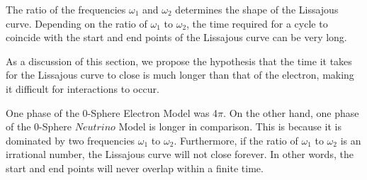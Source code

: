\documentclass[%
 reprint,
 amsmath,amssymb,
 aps,
]{revtex4-1}
\numberwithin{equation}{section}%
\begin{document}


The ratio of the frequencies $\omega_{\mathrm{1}}$ and $\omega_{\mathrm{2}}$ determines the shape of the Lissajous curve. Depending on the ratio of $\omega_{\mathrm{1}}$ to $\omega_{\mathrm{2}}$, the time required for a cycle to coincide with the start and end points of the Lissajous curve can be very long.

As a discussion of this section, we propose the hypothesis that the time it takes for the Lissajous curve to close is much longer than that of the electron, making it difficult for interactions to occur.

One phase of the 0-Sphere Electron Model was 4$\pi$. On the other hand, one phase of the 0-Sphere $Neutrino$ Model is longer in comparison. This is because it is dominated by two frequencies $\omega_{\mathrm{1}}$ to $\omega_{\mathrm{2}}$. Furthermore, if the ratio of $\omega_{\mathrm{1}}$ to $\omega_{\mathrm{2}}$ is an irrational number, the Lissajous curve will not close forever. In other words, the start and end points will never overlap within a finite time.
\end{document}
